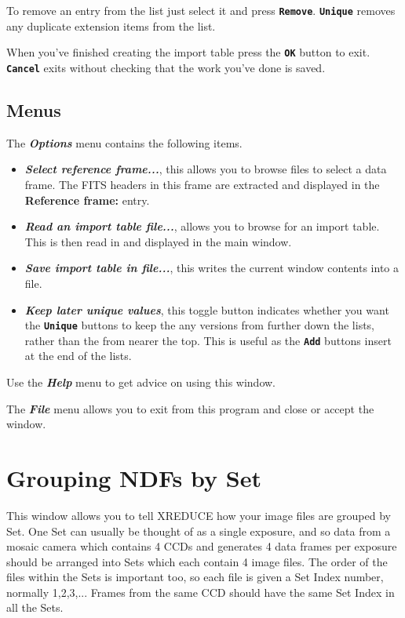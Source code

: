 \documentclass[11pt]{article}
\newcommand{\xlabel}[1]{}
\newcommand{\butt}[1]{{\bf \tt #1}}
\newcommand{\menu}[1]{{\bf \em #1}}
\newcommand{\wlab}[1]{{\bf #1}}
\begin{document}
To remove an entry from the list just select it and press
\butt{Remove}. \butt{Unique} removes any duplicate extension items
from the list.


When\xlabel{CCDCreateImportTableOK} you've finished creating the
import table press the \butt{OK} button to exit. \butt{Cancel} exits
without checking that the work you've done is saved.


\subsection{Menus \xlabel{CCDCreateImportTableMenu}}
The \menu{Options} menu contains the following items.
\begin{itemize}
\item \menu{Select reference frame...}, this allows you to browse files
to select a data frame. The FITS headers in this frame are extracted
and displayed in the \wlab{Reference frame:} entry.
\item \menu{Read an import table file...}, allows you to browse for an
import table. This is then read in and displayed in the main window.
\item \menu{Save import table in file...}, this writes the current
window contents into a file.
\item \menu{Keep later unique values}, this toggle button indicates
whether you want the \butt{Unique} buttons to keep the any versions from
further down the lists, rather than the from nearer the top. This is
useful as the \butt{Add} buttons insert at the end of the lists.
\end{itemize}

Use the \menu{Help} menu to get advice on using this window.

The \menu{File} menu allows you to exit from this program and close or
accept the window.

\section{Grouping NDFs by Set \xlabel{CCDAddSetHeadersWindow}}

This window allows you to tell XREDUCE how your image files are 
grouped by Set. 
One Set can usually be thought of as a single exposure,
and so data from a mosaic camera which contains 4 CCDs and generates 
4 data frames per exposure should be arranged into Sets which each
contain 4 image files.  The order of the files within the Sets is 
important too, so each file is given a Set Index number, normally 1,2,3,...
Frames from the same CCD should have the same Set Index in all the Sets.
\end{document}
